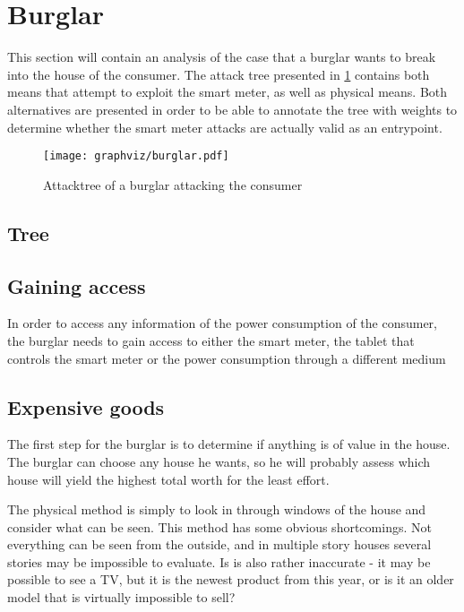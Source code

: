 \section{Burglar}
This section will contain an analysis of the case that a burglar wants to break into the house of the consumer.
The attack tree presented in \cref{attacktree:burglar} contains both means that attempt to exploit the smart meter, as well as physical means.
Both alternatives are presented in order to be able to annotate the tree with weights to determine whether the smart meter attacks are actually valid as an entrypoint.

\begin{figure}
\texttt{[image: graphviz/burglar.pdf]}
\caption{Attacktree of a burglar attacking the consumer}
\label{attacktree:burglar}
\end{figure}

\subsection{Tree}

\subsection{Gaining access}
In order to access any information of the power consumption of the consumer, the burglar needs to gain access to either the smart meter, the tablet that controls the smart meter or the power consumption through a different medium

\subsection{Expensive goods}
The first step for the burglar is to determine if anything is of value in the house. 
The burglar can choose any house he wants, so he will probably assess which house will yield the highest total worth for the least effort.

The physical method is simply to look in through windows of the house and consider what can be seen. 
This method has some obvious shortcomings.
Not everything can be seen from the outside, and in multiple story houses several stories may be impossible to evaluate.
Is is also rather inaccurate - it may be possible to see a TV, but it is the newest product from this year, or is it an older model that is virtually impossible to sell?


